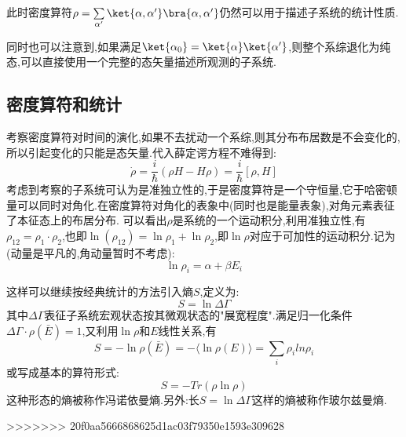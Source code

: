     此时密度算符$\rho=\sum\limits_{\alpha'}\ket{\alpha,\alpha'}\bra{\alpha,\alpha'}$仍然可以用于描述子系统的统计性质.

    同时也可以注意到,如果满足$\ket{\alpha_0}=\ket{\alpha}\ket{\alpha'}$,则整个系综退化为纯态,可以直接使用一个完整的态矢量描述所观测的子系统.

\subsection{密度算符和统计}
考察密度算符对时间的演化,如果不去扰动一个系综,则其分布布居数是不会变化的,所以引起变化的只能是态矢量.代入薛定谔方程不难得到:
\begin{equation}
    \dot{\rho}=\dfrac{i}{\hbar}(\rho H-H \rho)=\dfrac{i}{\hbar}\left[ \rho ,H\right] 
\end{equation}
考虑到考察的子系统可认为是准独立性的,于是密度算符是一个守恒量,它于哈密顿量可以同时对角化.在密度算符对角化的表象中(同时也是能量表象),对角元素表征了本征态上的布居分布.
可以看出$\rho$是系统的一个运动积分,利用准独立性,有$\rho_{12}=\rho_1\cdot \rho_2$,也即$\ln(\rho_{12})=\ln\rho_1+\ln\rho_2$,即$\ln\rho$对应于可加性的运动积分.记为(动量是平凡的,角动量暂时不考虑):
\begin{equation}
    \ln \rho_i=\alpha+\beta E_i
\end{equation}

这样可以继续按经典统计的方法引入熵$S$,定义为:
\begin{equation}
    S=\ln \Delta\Gamma
\end{equation}
其中$\Delta \Gamma$表征子系统宏观状态按其微观状态的"展宽程度".满足归一化条件$\Delta \Gamma \cdot \rho(\bar{E})=1$,又利用$\ln \rho$和$E$线性关系,有
\begin{equation}
    S=-\ln \rho(\bar{E})=-\langle \ln \rho(E) \rangle=\sum\limits_i \rho_i ln \rho_i
\end{equation}
或写成基本的算符形式:
\begin{equation}
    S=-Tr(\rho \ln \rho)
\end{equation}
这种形态的熵被称作冯诺依曼熵.另外:长$S=\ln\Delta\Gamma$这样的熵被称作玻尔兹曼熵.

>>>>>>> 20f0aa5666868625d1ac03f79350e1593e309628
